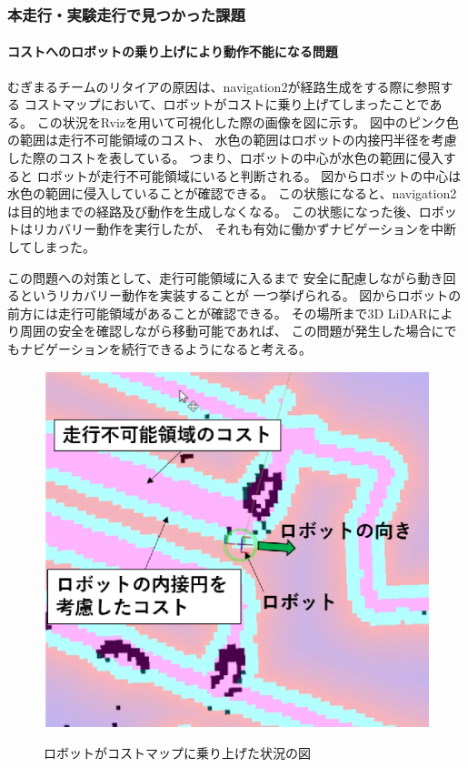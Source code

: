 \subsubsection{本走行・実験走行で見つかった課題}
\paragraph{コストへのロボットの乗り上げにより動作不能になる問題}
むぎまるチームのリタイアの原因は、navigation2が経路生成をする際に参照する
コストマップにおいて、ロボットがコストに乗り上げてしまったことである。
この状況をRvizを用いて可視化した際の画像を図\label{fig:mugimaru_result}に示す。
図中のピンク色の範囲は走行不可能領域のコスト、
水色の範囲はロボットの内接円半径を考慮した際のコストを表している。
つまり、ロボットの中心が水色の範囲に侵入すると
ロボットが走行不可能領域にいると判断される。
図\label{fig:mugimaru_result}からロボットの中心は
水色の範囲に侵入していることが確認できる。
この状態になると、navigation2は目的地までの経路及び動作を生成しなくなる。
この状態になった後、ロボットはリカバリー動作を実行したが、
それも有効に働かずナビゲーションを中断してしまった。

この問題への対策として、走行可能領域に入るまで
安全に配慮しながら動き回るというリカバリー動作を実装することが
一つ挙げられる。
図からロボットの前方には走行可能領域があることが確認できる。
その場所まで3D LiDARにより周囲の安全を確認しながら移動可能であれば、
この問題が発生した場合にでもナビゲーションを続行できるようになると考える。
\begin{figure}[h]
  \centering
  \includegraphics[width=1.0\linewidth]{figs/mugimaru_result.eps}
  \label{fig:mugimaru_result}
  \caption{ロボットがコストマップに乗り上げた状況の図} 
\end{figure}

